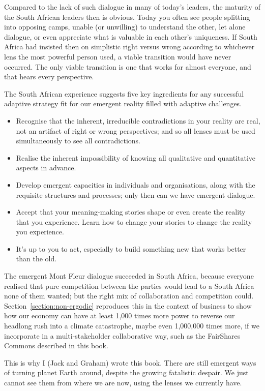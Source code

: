 Compared to the lack of such dialogue in many of today’s leaders, the maturity of the South African leaders then is obvious. Today you often see people splitting into opposing camps, unable (or unwilling) to understand the other, let alone dialogue, or even appreciate what is valuable in each other's uniqueness. If South Africa had insisted then on simplistic right versus wrong according to whichever lens the most powerful person used, a viable transition would have never occurred. The only viable transition is one that works for almost everyone, and that hears every perspective.


The South African experience suggests five key ingredients for any successful adaptive strategy fit for our emergent reality filled with adaptive challenges.


\begin{itemize}
\item Recognise that the inherent, irreducible contradictions in your reality are real, not an artifact of right or wrong perspectives; and so all lenses must be used simultaneously to see all contradictions.
\item Realise the inherent impossibility of knowing all qualitative and quantitative aspects in advance.
\item Develop emergent capacities in individuals and organisations, along with the requisite structures and processes; only then can we have emergent dialogue.
\item Accept that your meaning\hyp{}making stories shape or even create the reality that you experience. Learn how to change your stories to change the reality you experience.
\item It's up to you to act, especially to build something new that works better than the old.
\end{itemize}


The emergent Mont Fleur dialogue succeeded in South Africa, 
because everyone realised that pure competition between the parties would lead to a South Africa none of them wanted; but the right mix of collaboration and competition could. Section~\ref{section:non-ergodic} reproduces this in the context of business to show how our economy can have at least 1,000 times more power to reverse our headlong rush into a climate catastrophe, maybe even 1,000,000 times more, if we incorporate in a multi-stakeholder collaborative way, such as the FairShares Commons described in this book.


This is why I (Jack and Graham) wrote this book.  There are still emergent ways of turning planet Earth around, despite the growing fatalistic despair. We just cannot see them from where we are now, using the lenses we currently have.